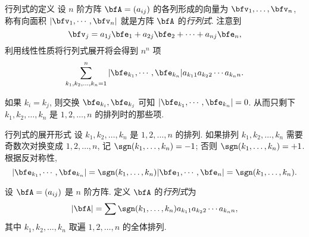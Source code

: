 

\begin{frame}{行列式的定义\noexer}
	\onslide<+->
	设 $n$ 阶方阵 $\bfA=(a_{ij})$ 的各列形成的向量为 $\bfv_1,\dots,\bfv_n$,
	\onslide<+->
	称有向面积 $|\bfv_1,\cdots,\bfv_n|$ 就是方阵 $\bfA$ 的\emph{行列式}.
	\onslide<+->
	注意到
	\[\bfv_j=a_{1j}\bfe_1+a_{2j}\bfe_2+\cdots+a_{nj}\bfe_n,\]
	\onslide<+->
	利用线性性质将行列式展开将会得到 $n^n$ 项
	\[\sum_{k_1,k_2,\dots,k_n=1}^n|\bfe_{k_1},\cdots,\bfe_{k_n}| a_{k_11}a_{k_22}\cdots a_{k_nn}.\]

	\onslide<+->
	如果 $k_i=k_j$, 则交换 $\bfe_{k_i},\bfe_{k_j}$ 可知 $|\bfe_{k_1},\cdots,\bfe_{k_n}|=0$.
	\onslide<+->
	从而只剩下 $k_1,k_2,\dots,k_n$ 是 $1,2,\dots,n$ 的排列时的那些项.
\end{frame}
	
	
\begin{frame}{行列式的展开形式\noexer}
	\onslide<+->
	设 $k_1,k_2,\dots,k_n$ 是 $1,2,\dots,n$ 的排列.
	\onslide<+->
	如果排列 $k_1,k_2,\dots,k_n$ 需要奇数次对换变成 $1,2,\dots,n$, 记 	$\sgn(k_1,\dots,k_n)=-1$; 否则 $\sgn(k_1,\dots,k_n)=+1$.
	\onslide<+->
	根据反对称性,
	\[|\bfe_{k_1},\cdots,\bfe_{k_n}|=\sgn(k_1,\dots,k_n)|\bfe_1,\cdots,\bfe_n|=\sgn(k_1,\dots,k_n).\]
	\onslide<+->
	\begin{definition}
		设 $\bfA=(a_{ij})$ 是 $n$ 阶方阵.
		定义 $\bfA$ 的\emph{行列式}为
		\[|\bfA|=\sum \sgn(k_1,\dots,k_n) a_{k_11}a_{k_22}\cdots a_{k_nn},\]
		其中 $k_1,k_2,\dots,k_n$ 取遍 $1,2,\dots,n$ 的全体排列.
	\end{definition}
\end{frame}


